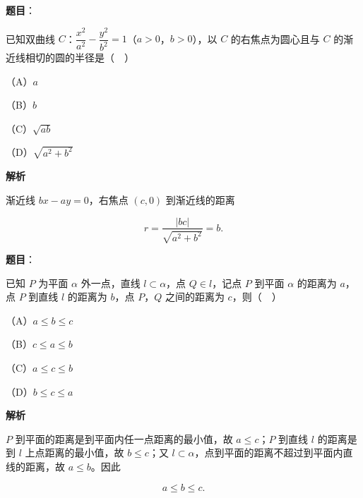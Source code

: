 \begin{answer}

\textbf{题目}：

已知双曲线 $C$：$\dfrac{x^2}{a^2}-\dfrac{y^2}{b^2}=1$（$a>0$，$b>0$），以 $C$ 的右焦点为圆心且与 $C$ 的渐近线相切的圆的半径是（　）

（A）$a$

（B）$b$

（C）$\sqrt{ab}$

（D）$\sqrt{a^2+b^2}$

\textbf{解析}

渐近线 $bx-ay=0$，右焦点 $(c,0)$ 到渐近线的距离

\nopagebreak[4]
\[r=\frac{|bc|}{\sqrt{a^2+b^2}}=b.\]


\end{answer}
\begin{answer}

\textbf{题目}：

已知 $P$ 为平面 $\alpha$ 外一点，直线 $l\subset\alpha$，点 $Q\in l$，记点 $P$ 到平面 $\alpha$ 的距离为 $a$，点 $P$ 到直线 $l$ 的距离为 $b$，点 $P$，$Q$ 之间的距离为 $c$，则（　）

（A）$a\leqslant b\leqslant c$

（B）$c\leqslant a\leqslant b$

（C）$a\leqslant c\leqslant b$

（D）$b\leqslant c\leqslant a$

\textbf{解析}

$P$ 到平面的距离是到平面内任一点距离的最小值，故 $a\leqslant c$；$P$ 到直线 $l$ 的距离是到 $l$ 上点距离的最小值，故 $b\leqslant c$；又 $l\subset\alpha$，点到平面的距离不超过到平面内直线的距离，故 $a\leqslant b$。因此

\nopagebreak[4]
\[a\leqslant b\leqslant c.\]


\end{answer}
